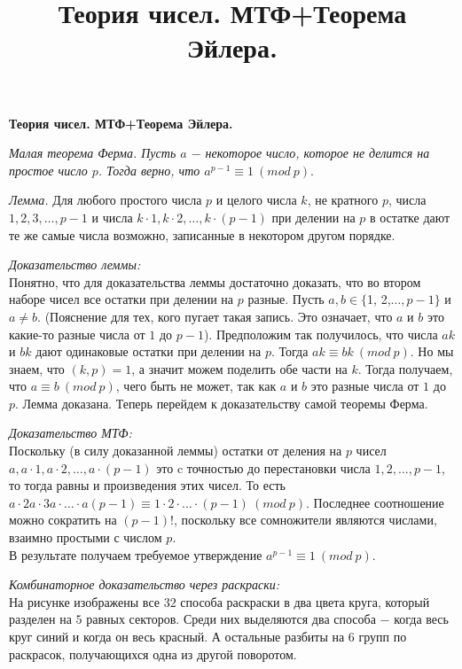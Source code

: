 \centerline{\bf \Huge Теория чисел. МТФ+Теорема Эйлера.}
\title{Теория чисел. МТФ+Теорема Эйлера.}

\textit{Малая теорема Ферма. Пусть $a$ $-$ некоторое число, которое не делится на простое число $p$. Тогда верно, что $a^{p-1} \equiv 1 \ (mod \ p)$}.

\par

\textit{Лемма.}  Для любого простого числа $p$ и целого числа $k$, не кратного $p$, числа $1, 2, 3, \dots , p-1$ и числа $k\cdot 1,  k \cdot 2, \dots ,  k \cdot (p-1)$  при делении на $p$ в остатке дают те же самые числа возможно, записанные в некотором другом порядке.

\par 

\textit{Доказательство леммы:}\\
Понятно, что для доказательства леммы достаточно доказать, что во втором наборе чисел все остатки при делении на $p$ разные. Пусть $a, b \in \{$1, 2,$ \dots , p - 1\}$ и $a \neq b$. (Пояснение для тех, кого пугает такая запись. Это означает, что $a$ и $b$ это какие-то разные числа от $1$ до $p-1$). Предположим так получилось, что числа $ak$ и $bk$ дают одинаковые остатки при делении на $p$. Тогда $ak \equiv bk \ (mod \ p)$. Но мы знаем, что $(k, p) = 1$, а значит можем поделить обе части на $k$. Тогда получаем, что $a \equiv b \ (mod \ p)$, чего быть не может, так как $a$ и $b$ это разные числа от $1$ до $p$. Лемма доказана. Теперь перейдем к доказательству самой теоремы Ферма.

\textit{Доказательство МТФ:}\\
Поскольку (в силу доказанной леммы) остатки от деления на $p$ чисел $a, a\cdot1, a\cdot2, \dots, a\cdot(p-1)$ это c точностью до перестановки числа $1, 2, \dots, p-1$, то тогда равны и произведения этих чисел. То есть  $a\cdot 2a \cdot 3a \cdot \ldots \cdot a(p-1) \equiv 1 \cdot 2 \cdot \ldots \cdot (p-1) \ (mod \ p)$. Последнее соотношение можно сократить на $(p - 1)!$, поскольку все сомножители являются числами, взаимно простыми с числом $p$.\\
В результате получаем требуемое утверждение $a^{p-1} \equiv 1 \ (mod \ p).$

\textit{Комбинаторное доказательство через раскраски:}\\
На рисунке изображены все $32$ способа раскраски в два цвета круга, который разделен на $5$ равных секторов. Среди них выделяются два способа $-$ когда весь круг синий и когда он весь красный. А остальные разбиты на $6$ групп по  раскрасок, получающихся одна из другой поворотом.

